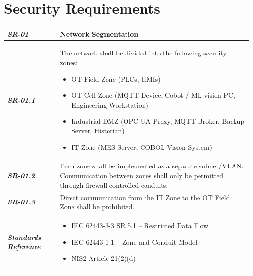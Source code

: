 \section{Security Requirements}\label{sec:secrec}

\begin{tabularx}
{\textwidth}{>{\bfseries}p{2.5cm} X}
\textit{SR-01} & \textbf{Network Segmentation} \vspace{0.5em}\\
\toprule
\textit{SR-01.1} &
The network shall be divided into the following security zones:
\begin{itemize}[label=-, itemsep=0pt, topsep=2pt]
    \item OT Field Zone (PLCs, HMIs)
    \item OT Cell Zone (MQTT Device, Cobot / ML vision PC, Engineering Workstation)
    \item Industrial DMZ (OPC UA Proxy, MQTT Broker, Backup Server, Historian)
    \item IT Zone (MES Server, COBOL Vision System)
\end{itemize} \vspace{0.5em}
\\
\textit{SR-01.2} &
Each zone shall be implemented as a separate subnet/VLAN.
Communication between zones shall only be permitted through
    firewall-controlled conduits. \vspace{0.5em}
\\
\textit{SR-01.3} &
Direct communication from the IT Zone to the OT Field Zone
    shall be prohibited. \vspace{0.5em}
\\
\midrule
    \textit{Standards Reference} &
\begin{itemize}[label=-, noitemsep, topsep=0pt, leftmargin=*]
    \item IEC 62443-3-3 SR 5.1 -- Restricted Data Flow
    \item IEC 62443-1-1 -- Zone and Conduit Model
    \item NIS2 Article 21(2)(d)
\end{itemize} \vspace{1em} \\ 
\end{tabularx}
\vspace{2em}

